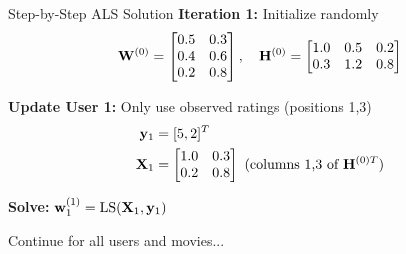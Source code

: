 \documentclass{beamer}
\begin{document}
\begin{frame}{Step-by-Step ALS Solution}
\textbf{Iteration 1:} Initialize randomly
\begin{equation*}
\mathbf{W}^{(0)} = \begin{bmatrix} 0.5 & 0.3 \\ 0.4 & 0.6 \\ 0.2 & 0.8 \end{bmatrix}, \quad
\mathbf{H}^{(0)} = \begin{bmatrix} 1.0 & 0.5 & 0.2 \\ 0.3 & 1.2 & 0.8 \end{bmatrix}
\end{equation*}

\pause
\textbf{Update User 1:} Only use observed ratings (positions 1,3)
\begin{align}
\mathbf{y}_1 &= [5, 2]^T \\
\mathbf{X}_1 &= \begin{bmatrix} 1.0 & 0.3 \\ 0.2 & 0.8 \end{bmatrix} \text{ (columns 1,3 of } \mathbf{H}^{(0)T}\text{)}
\end{align}

\pause
\textbf{Solve:} $\mathbf{w}_1^{(1)} = \text{LS}(\mathbf{X}_1, \mathbf{y}_1)$

Continue for all users and movies...
\end{frame}
\end{document}
